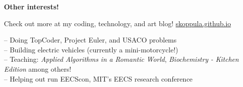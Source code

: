\documentclass[letterpaper,11pt]{article}
\begin{document}
\vspace{0.1in}
\large \textbf{Other interests!\vspace{1mm}} \normalsize 
\begin{center}Check out more at my coding, technology, and art blog! \href{http://www.skoppula.github.io}{skoppula.github.io} \end{center} 
\hspace{2mm} -- Doing TopCoder, Project Euler, and USACO problems \\
\hspace{2mm} -- Building electric vehicles (currently a mini-motorcycle!) \\
\hspace{2mm} -- Teaching: \textit{Applied Algorithms in a Romantic World}, \textit{Biochemistry - Kitchen Edition} among others! \\ 
\hspace{2mm} -- Helping out run EECScon, MIT's EECS research conference \\
\end{document}
